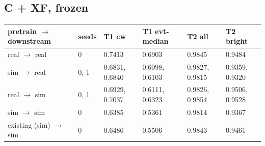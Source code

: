\documentclass[10pt,a4paper]{article}
\begin{document}
\subsection{C + XF, frozen}
\begin{center}\footnotesize
\setlength{\tabcolsep}{3pt}\renewcommand{\arraystretch}{1.15}
\begin{tabularx}{\linewidth}{LLLLLL}
\toprule
\textbf{pretrain $\rightarrow$ downstream} & \textbf{seeds} & \textbf{T1 cw} & \textbf{T1 evt-median} & \textbf{T2 all} & \textbf{T2 bright} \\
\midrule
real $\rightarrow$ real & 0 & 0.7413 & 0.6903 & 0.9845 & 0.9484 \\
sim $\rightarrow$ real & 0, 1 & 0.6831, 0.6840 & 0.6098, 0.6103 & 0.9827, 0.9815 & 0.9359, 0.9320 \\
real $\rightarrow$ sim & 0, 1 & 0.6929, 0.7037 & 0.6111, 0.6323 & 0.9826, 0.9854 & 0.9506, 0.9528 \\
sim $\rightarrow$ sim & 0 & 0.6385 & 0.5361 & 0.9814 & 0.9367 \\
existing (sim) $\rightarrow$ sim & 0 & 0.6486 & 0.5506 & 0.9843 & 0.9461 \\
\bottomrule
\end{tabularx}
\end{center}
\end{document}
